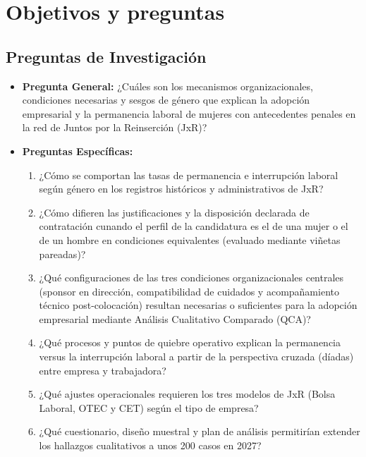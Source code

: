 \section{Objetivos y preguntas}

\subsection{Preguntas de Investigación}
\begin{itemize}
    \item \textbf{Pregunta General:} ¿Cuáles son los mecanismos organizacionales, condiciones necesarias y sesgos de género que explican la adopción empresarial y la permanencia laboral de mujeres con antecedentes penales en la red de Juntos por la Reinserción (JxR)?
    \item \textbf{Preguntas Específicas:}
    \begin{enumerate}
        \item ¿Cómo se comportan las tasas de permanencia e interrupción laboral según género en los registros históricos y administrativos de JxR?
        \item ¿Cómo difieren las justificaciones y la disposición declarada de contratación cunando el perfil de la candidatura es el de una mujer o el de un hombre en condiciones equivalentes (evaluado mediante viñetas pareadas)?
        \item ¿Qué configuraciones de las tres condiciones organizacionales centrales (sponsor en dirección, compatibilidad de cuidados y acompañamiento técnico post-colocación) resultan necesarias o suficientes para la adopción empresarial mediante Análisis Cualitativo Comparado (QCA)?
        \item ¿Qué procesos y puntos de quiebre operativo explican la permanencia versus la interrupción laboral a partir de la perspectiva cruzada (díadas) entre empresa y trabajadora?
        \item ¿Qué ajustes operacionales requieren los tres modelos de JxR (Bolsa Laboral, OTEC y CET) según el tipo de empresa?
        \item ¿Qué cuestionario, diseño muestral y plan de análisis permitirían extender los hallazgos cualitativos a unos 200 casos en 2027?
    \end{enumerate}
\end{itemize}

